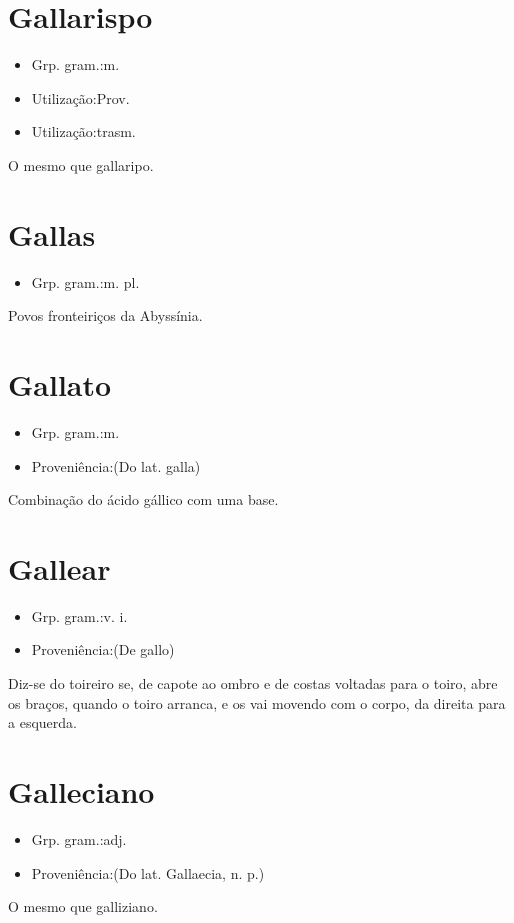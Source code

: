 \section{Gallarispo}
\begin{itemize}
\item {Grp. gram.:m.}
\end{itemize}
\begin{itemize}
\item {Utilização:Prov.}
\end{itemize}
\begin{itemize}
\item {Utilização:trasm.}
\end{itemize}
O mesmo que \textunderscore gallaripo\textunderscore .
\section{Gallas}
\begin{itemize}
\item {Grp. gram.:m. pl.}
\end{itemize}
Povos fronteiriços da Abyssínia.
\section{Gallato}
\begin{itemize}
\item {Grp. gram.:m.}
\end{itemize}
\begin{itemize}
\item {Proveniência:(Do lat. \textunderscore galla\textunderscore )}
\end{itemize}
Combinação do ácido gállico com uma base.
\section{Gallear}
\begin{itemize}
\item {Grp. gram.:v. i.}
\end{itemize}
\begin{itemize}
\item {Proveniência:(De \textunderscore gallo\textunderscore )}
\end{itemize}
Diz-se do toireiro se, de capote ao ombro e de costas voltadas para o toiro, abre os braços, quando o toiro arranca, e os vai movendo com o corpo, da direita para a esquerda.
\section{Galleciano}
\begin{itemize}
\item {Grp. gram.:adj.}
\end{itemize}
\begin{itemize}
\item {Proveniência:(Do lat. \textunderscore Gallaecia\textunderscore , n. p.)}
\end{itemize}
O mesmo que \textunderscore galliziano\textunderscore .
